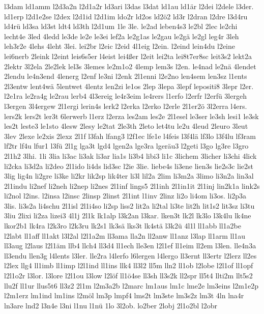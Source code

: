 {l3dam
ld1amm
l2d3a2n
l2d1a2r
ld3ari
l3das
l3dat
ld1au
ld1är
l2dei
l2dele
l3der.
ld1erp
l2d1e2se
l2dex
l2d1id
l2d1im
ldo2r
ld2os
ld2ö2
ld3r
l2dran
l2dre
l3d4ru
ld4rü
ld3sa
ld3st
ldt4
ld3th
l2d1um
1le
3le.
le2ad
leben4s3
le2bl
2lec
le2chi
lecht4e
3led
4ledd
le3de
le2e
le3ei
lef2a
le2g1as
le2gau
le2gä
le2gl
leg4r
3leh
leh3r2e
4lehs
4leht
3lei.
lei2br
l2eic
l2eid
4l1eig
l2ein.
l2eind
lein4du
l2eine
lei6nerb
2leink
l2eint
leis6s5er
l4eist
lei4ßer
l2eit
lei2ta
lei8t7er8sc
leit3s2
lekt2a
2lektr
3l2ela
2le2lek
lel3s
3lemes
le2m1o2
4lemp
lem3s
l2en.
le4nad
le2nä
4lendet
2lendu
le4n3end
4lenerg
l2enf
le3ni
l2enk
2l1enni
l2e2no
len4sem
len3sz
l1ents
2l3entw
lent4wä
5lentwet
4lentz
len2zi
le1os
2lep
3lepa
3lepf
lepositi8
3lepr
l2er.
l2e1ra
le2ra4g
le2rau
lerb4
4l3ereig
le4r3eim
le4rers
l1erfo
l2erfr
l2erfü
3lergeh
l3ergen
3l4ergew
2l1ergi
lerin4s
lerk2
l2erka
l2erko
l2erle
2l1er2ö
3l2erra
l4ers.
lers2k
lers2t
ler3t
6lerwerb
l1erz
l2erza
les2am
les2e
2l1esel
le3ser
le3sh
lesi1
le3sk
les2t
leste3
le1sto
4lesw
2lesy
le2tat
2le3th
2leto
let4tu
le2u
4leud
2leuro
3leut
3lev
2lexe
le2xis
2lexz
2l1f
l3fah
lfang3
l2f1ec
lfe1e
l4feis
l3f4lä
lf3lo
l3f4lu
lf3ram
lf2tr
lf4u
lfur1
l3fü
2l1g
lga3t
lgd4
lgen2a
lge3ra
lgeräu3
l2geti
l3go
lg3re
l3gro
2l1h2
3lhi.
1li
3lia
li3ac
li3ak
li3ar
lia1s
li3b4
libi3
li1c
3lichem
3licher
li3chi
4lick
li2cka
li3d2a
li2deo
2l1ido
li4ds
lid3sc
l2ie
3lie.
liebe4s
li3ene
lien3s
lie2s3c
lie2st
3lig
lig4n
li2gre
li3ke
li2kr
lik2sp
lik4ter
li3l
lil2a
2lim
li3m2a
3limo
li3n2a
lin3al
2l1indu
li2nef
li2neh
li2nep
li2nes
2l1inf
lings5
2l1inh
2l1in1it
2l1inj
lin2k1a
link2s
li2nol
l2ins.
l2insa
l2insc
2linsp
2linst
2l1int
l1inv
2linz
li2o
li4om
li3os.
li2p3a
3lis.
li3s2a
li4schu
2l1isl
2l1i4so
li2sp
liss2
lit2a
li2tal
li3te
lit2h
lit1s2
lit3sz
li3tu
3liu
2lixi
li2za
lizei3
4l1j
2l1k
lk1alp
l3k2an
l3kar.
lken3t
lk2l
lk3lo
l3k4lu
lk4ne
lkor2b1
lk4ra
l2k3ro
l2k3ru
lk2s1
lk3sä
lks3t
lk4stä
l3k2ü
4l1l
ll1abb
ll1a2be
l2labt
ll1aff
ll1akt
l3l2al
l2l1a2m
ll3ama
lla2n
ll2anw
ll1anz
l3lap
ll1arm
ll1au
ll3aug
l2laus
l2l1äm
llb4
llch4
ll3d4
ll1ech
lle3en
l2l1ef
ll1eim
ll2em
l3len.
lle4n3a
ll3endu
llen3g
l4lents
l3ler.
lle2ra
l4lerfo
l6lergen
l4lergo
ll3ernt
ll3ertr
l2lerz
ll2es
l2lex
llg4
ll1imb
ll1imp
l2l1ind
ll1ins
llk4
ll3l2
ll5m
lln2
ll1ob
l2lobe
l2l1of
ll1opf
l2l1o2r
l3lor.
l3lore
l2l1ou
l3low
l2löf
ll1ö4se
ll3sh
ll3s2k
ll2spr
ll5t4
llti2m
llt5s2
llu2f
ll1ur
llus5t6
ll3z2
2l1m
l2m3a2b
l2marc
lm1aus
lm1c
lme2e
lm3eins
l2m1e2p
l2m1erz
lm1ind
lm1ins
l2möl
lm3p
lmpf4
lms2t
lm3ste
lm3s2z
lm3t
4ln
lna4r
ln3are
lnd2
l3n4e
l3ni
l1nu
l1nü
1lo
3l2ob.
lo2ber
2lobj
2l1o2bl
l2obr
}
